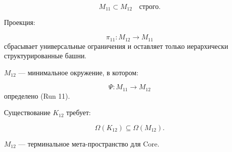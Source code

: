 \[
M_{11} \subset M_{12}
\quad\text{строго}.
\]

Проекция:

\[
\pi_{11}: M_{12} \to M_{11}
\]
сбрасывает универсальные ограничения и оставляет только иерархически структурированные башни.

$M_{12}$ — минимальное окружение, в котором:

\[
\Psi: M_{11} \to M_{12}
\]
определено (Run 11).

Существование $K_{12}$ требует:

\[
\Omega(K_{12}) \subseteq \Omega(M_{12}).
\]

$M_{12}$ — терминальное мета-пространство для Core.
